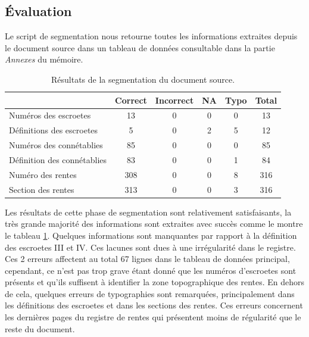 \subsection{Évaluation}
Le script de segmentation nous retourne toutes les informations extraites depuis le document source dans un tableau de données consultable dans la partie \textit{Annexes} du mémoire. 
\begin{table}[ht]
    \centering
    \begin{tabular}{|l||c|c|c|c|c|}
        \hline		&	\textbf{Correct}	&	\textbf{Incorrect}	&	\textbf{NA}	&	\textbf{Typo}	&	\textbf{Total} \\
        \hline
        \hline	Numéros des escroetes	&	13	&	0	&	0	&	0	&	13\\
        \hline	Définitions des escroetes	&	5	&	0	&	2	&	5	&	12 \\
        \hline	Numéros des connétablies	&	85	&	0	&	0	&	0	&	85 \\
        \hline	Définition des connétablies	&	83	&	0	&	0	&	1	&	84 \\
        \hline	Numéro des rentes	&	308	&	0	&	0	&	8	&	316 \\
        \hline	Section des rentes	&	313	&	0	&	0	&	3	&	316 \\
        \hline
    \end{tabular}
    \caption{Résultats de la segmentation du document source.}
    \label{eval_seg}
\end{table}

Les résultats de cette phase de segmentation sont relativement satisfaisants, la très grande majorité des informations sont extraites avec succès comme le montre le tableau \ref{eval_seg}. 
Quelques informations sont manquantes par rapport à la définition des escroetes III et IV. Ces lacunes sont dues à une irrégularité dans le registre. Ces 2 erreurs affectent au total 67 lignes dans le tableau de données principal, cependant, ce n'est pas trop grave étant donné que les numéros d'escroetes sont présents et qu'ils suffisent à identifier la zone topographique des rentes. En dehors de cela, quelques erreurs de typographies sont remarquées, principalement dans les définitions des escroetes et dans les sections des rentes. Ces erreurs concernent les dernières pages du registre de rentes qui présentent moins de régularité que le reste du document.






